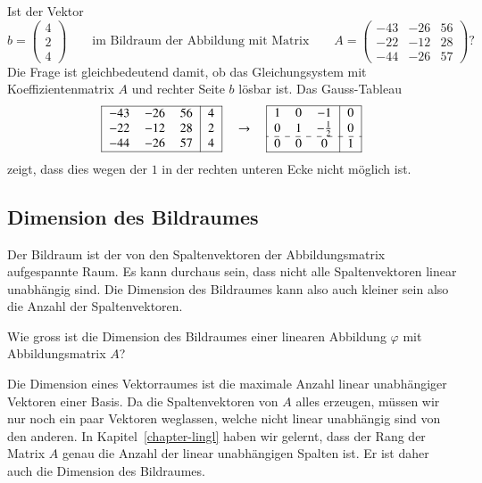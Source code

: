 \begin{beispiel}
Ist der Vektor
\[
b=\begin{pmatrix}4\\2\\4\end{pmatrix}
\qquad\text{im Bildraum der Abbildung mit Matrix}\qquad
A=
\begin{pmatrix}
  -43& -26&  56\\
  -22& -12&  28\\
  -44& -26&  57
\end{pmatrix}\text{?}
\]
Die Frage ist gleichbedeutend damit, ob das Gleichungsystem mit
Koeffizientenmatrix $A$ und rechter Seite $b$ lösbar ist.
Das Gauss-Tableau
\[
\begin{tabular}{|>{$}c<{$}>{$}c<{$}>{$}c<{$}|>{$}c<{$}|}
\hline
  -43& -26&  56&4\\
  -22& -12&  28&2\\
  -44& -26&  57&4\\
\hline
\end{tabular}
\quad\rightarrow\quad
\begin{tabular}{|>{$}c<{$}>{$}c<{$}>{$}c<{$}|>{$}c<{$}|}
\hline
   1&  0& -1&  0\\
   0&  1& -\frac12&   0\\
\hdashline
   0&  0&  0&  1\\
\hline
\end{tabular}
\]
zeigt, dass dies wegen der $1$ in der rechten unteren Ecke nicht möglich
ist.
\end{beispiel}

\subsection{Dimension des Bildraumes}
Der Bildraum ist der von den Spaltenvektoren der Abbildungsmatrix
aufgespannte Raum.
Es kann durchaus sein, dass nicht alle Spaltenvektoren linear unabhängig
sind.
Die Dimension des Bildraumes kann also auch kleiner sein also die
Anzahl der Spaltenvektoren.

\begin{aufgabe}
Wie gross ist die Dimension des Bildraumes einer linearen Abbildung
$\varphi$ mit Abbildungsmatrix $A$?
\end{aufgabe}
Die Dimension eines Vektorraumes ist die maximale Anzahl linear
unabhängiger Vektoren einer Basis.
Da die Spaltenvektoren von $A$ alles erzeugen, müssen wir nur noch
ein paar Vektoren weglassen, welche nicht linear unabhängig sind von
den anderen.
In Kapitel~\ref{chapter-lingl} haben wir gelernt, dass der Rang der
Matrix $A$ genau die Anzahl der linear unabhängigen Spalten ist.
Er ist daher auch die Dimension des Bildraumes.

